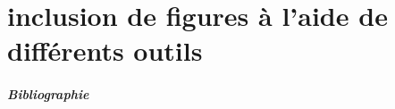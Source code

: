 \documentclass{beamer}
\begin{document}

\part{ inclusion de figures à l'aide de différents outils}






\begin{frame}
  \frametitle{Bibliographie}

\nocite{*}


\end{frame}


\end{document}
